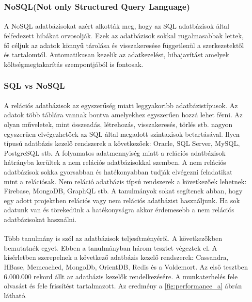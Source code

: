 \documentclass{article}
\begin{document}
	\subsubsection{NoSQL(Not only Structured Query Language)}
	\paragraph{}
	A NoSQL adatbázisokat azért alkották meg, hogy az SQL adatbázisok által felfedezett hibákat orvosolják. Ezek az adatbázisok sokkal rugalmasabbak lettek, fő céljuk az adatok könnyű tárolása és visszakeresése függetlenül a szerkezetektől és tartalomtól. Automatikusan kezelik az adatkezelést, hibajavítást amelyek költségmegtakarítás szempontjából is fontosak.\cite{venkatraman2016sql} 
	
	\subsubsection{SQL vs NoSQL}
	\paragraph{}
	A relációs adatbázisok az egyszerűség miatt leggyakoribb adatbázistípusok. Az adatok több táblára vannak bontva amelyekhez egyszerűen hozzá lehet férni. Az olyan műveletek, mint összeadás, létrehozás, visszakeresés, törlés stb. nagyon egyszerűen elvégezhetőek az SQL által megadott szintaxisok betartásával. Ilyen típusú adatbázis kezelő rendszerek a következőek: Oracle, SQL Server, MySQL, PostgreSQL stb. A folyamatos adatmennyiség miatt a relációs adatbázisok hátrányba kerültek a nem relációs adatbázisokkal szemben. A nem relációs adatbázisok sokka gyorsabban és hatékonyabban tudják elvégezni feladatikat mint a relációsak. Nem reláció adatbázis típsú rendszerek a következőek lehetnek: Firebase, MongoDB, GraphQL stb.\cite{gupta2017nosql} A tanulmányok sokat segítenek abban, hogy egy adott projektben relációs vagy nem relációs adatbázist használjunk. Ha sok adatunk van és törekedünk a hatékonyságra akkor érdemesebb a nem relációs adatbázisokat használni. 
	\paragraph{}
	Több tanulmány is szól az adatbázisok teljesítményéről. A következőkben bemutatnék egyet. Ebben a tanulmányban három tesztet végeztek el. A kísérletben szerepelnek a következő adatbázis kezelő rendszerek: Cassandra, HBase, Memcached, MongoDb, OrientDB, Redis és a Voldemort.\cite{martins2019study} Az első tesztben 6.000.000 rekord állt az adatbázis kezelők rendelkezésére. A munkaterhelés fele olvasást és fele frissítést tartalmazott. Az eredmény a \ref{fig:performance_a} ábrán látható.
	
\end{document}
